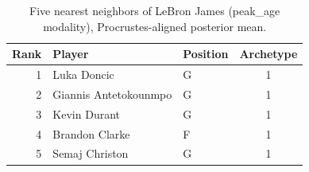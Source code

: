 \begin{table}[htbp]
  \centering\small
  \begin{tabular}{rllc}
    \toprule
    Rank & Player & Position & Archetype \\
    \midrule
    1 & Luka Doncic & G & 1 \\
    2 & Giannis Antetokounmpo & G & 1 \\
    3 & Kevin Durant & G & 1 \\
    4 & Brandon Clarke & F & 1 \\
    5 & Semaj Christon & G & 1 \\
    \bottomrule
  \end{tabular}
  \caption{Five nearest neighbors of LeBron James (peak_age modality), Procrustes-aligned posterior mean.}
  \label{tab:LeBron_James_neighbors_peak_age}
\end{table}


